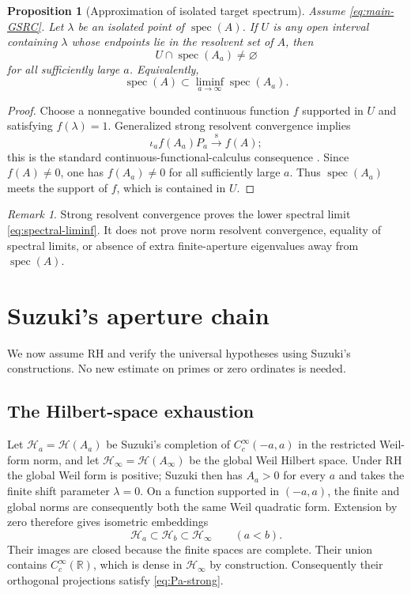 \documentclass[11pt]{article}
\newtheorem{proposition}[theorem]{Proposition}
\theoremstyle{remark}
\newtheorem{remark}[theorem]{Remark}
\newcommand{\Hh}{\mathcal H}
\newcommand{\spec}{\operatorname{spec}}
\newcommand{\R}{\mathbb R}
\begin{document}
\begin{proposition}[Approximation of isolated target spectrum]\label{prop:spectral-approx}
Assume \eqref{eq:main-GSRC}.  Let $\lambda$ be an isolated point of $\spec(A)$.  If $U$ is any
open interval containing $\lambda$ whose endpoints lie in the resolvent set of $A$, then
\[
 U\cap\spec(A_a)\ne\varnothing
\]
for all sufficiently large $a$.  Equivalently,
\begin{equation}\label{eq:spectral-liminf}
 \spec(A)\subset\liminf_{a\to\infty}\spec(A_a).
\end{equation}
\end{proposition}

\begin{proof}
Choose a nonnegative bounded continuous function $f$ supported in $U$ and satisfying
$f(\lambda)=1$.  Generalized strong resolvent convergence implies
\[
 \iota_af(A_a)P_a\xrightarrow{\mathrm{s}}f(A);
\]
this is the standard continuous-functional-calculus consequence
\cite{TeschlEtAl2026}.  Since $f(A)\ne0$, one has $f(A_a)\ne0$ for all sufficiently large $a$.
Thus $\spec(A_a)$ meets the support of $f$, which is contained in $U$.
\end{proof}

\begin{remark}
Strong resolvent convergence proves the lower spectral limit
\eqref{eq:spectral-liminf}.  It does not prove norm resolvent convergence, equality of spectral
limits, or absence of extra finite-aperture eigenvalues away from $\spec(A)$.
\end{remark}

\section{Suzuki's aperture chain}\label{sec:Suzuki}

We now assume RH and verify the universal hypotheses using Suzuki's constructions.  No new
estimate on primes or zero ordinates is needed.

\subsection{The Hilbert-space exhaustion}

Let $\Hh_a=\Hh(A_a)$ be Suzuki's completion of $C_c^\infty(-a,a)$ in the restricted Weil-form norm,
and let $\Hh_\infty=\Hh(A_\infty)$ be the global Weil Hilbert space.  Under RH the global Weil form
is positive; Suzuki then has $A_a>0$ for every $a$ and takes the finite shift parameter
$\lambda=0$.  On a function supported in $(-a,a)$, the finite and global norms are consequently
both the same Weil quadratic form.  Extension by zero therefore gives isometric embeddings
\begin{equation}\label{eq:Suzuki-space-chain}
 \Hh_a\subset\Hh_b\subset\Hh_\infty
 \qquad(a<b).
\end{equation}
Their images are closed because the finite spaces are complete.  Their union contains
$C_c^\infty(\R)$, which is dense in $\Hh_\infty$ by construction.  Consequently their orthogonal
projections satisfy \eqref{eq:Pa-strong}.
\end{document}
